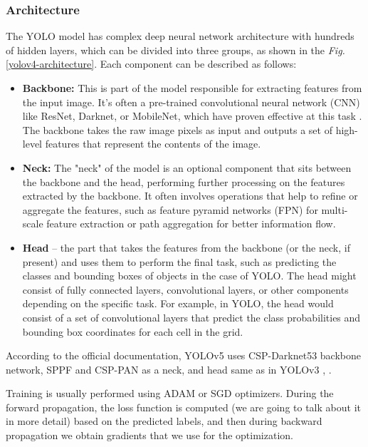 \documentclass[14pt,a4paper]{extarticle}
\newcounter{e}
\numberwithin{equation}{section}
\numberwithin{figure}{section}
\begin{document}
\subsubsection{Architecture}
The YOLO model has complex deep neural network architecture with hundreds of hidden layers, which can be divided into three groups, as shown in the \textit{Fig.} \ref{yolov4-architecture}. Each component can be described as follows:

\begin{itemize}
    \item \textbf{Backbone:} This is part of the model responsible for extracting features from the input image. It's often a pre-trained convolutional neural network (CNN) like ResNet, Darknet, or MobileNet, which have proven effective at this task \cite{darknet}. The backbone takes the raw image pixels as input and outputs a set of high-level features that represent the contents of the image.
    \item \textbf{Neck:} The "neck" of the model is an optional component that sits between the backbone and the head, performing further processing on the features extracted by the backbone. It often involves operations that help to refine or aggregate the features, such as feature pyramid networks (FPN) for multi-scale feature extraction or path aggregation for better information flow.
    \item \textbf{Head} -- the part that takes the features from the backbone (or the neck, if present) and uses them to perform the final task, such as predicting the classes and bounding boxes of objects in the case of YOLO. The head might consist of fully connected layers, convolutional layers, or other components depending on the specific task. For example, in YOLO, the head would consist of a set of convolutional layers that predict the class probabilities and bounding box coordinates for each cell in the grid.
\end{itemize}

According to the official documentation, YOLOv5 uses CSP-Darknet53 backbone network, SPPF and CSP-PAN as a neck, and head same as in YOLOv3 \cite{yolov3}, \cite{yolov5-docks}.

Training is usually performed using ADAM \cite{adam} or SGD \cite{sgd} optimizers. During the forward propagation, the loss function is computed (we are going to talk about it in more detail) based on the predicted labels, and then during backward propagation we obtain gradients that we use for the optimization.
\end{document}
